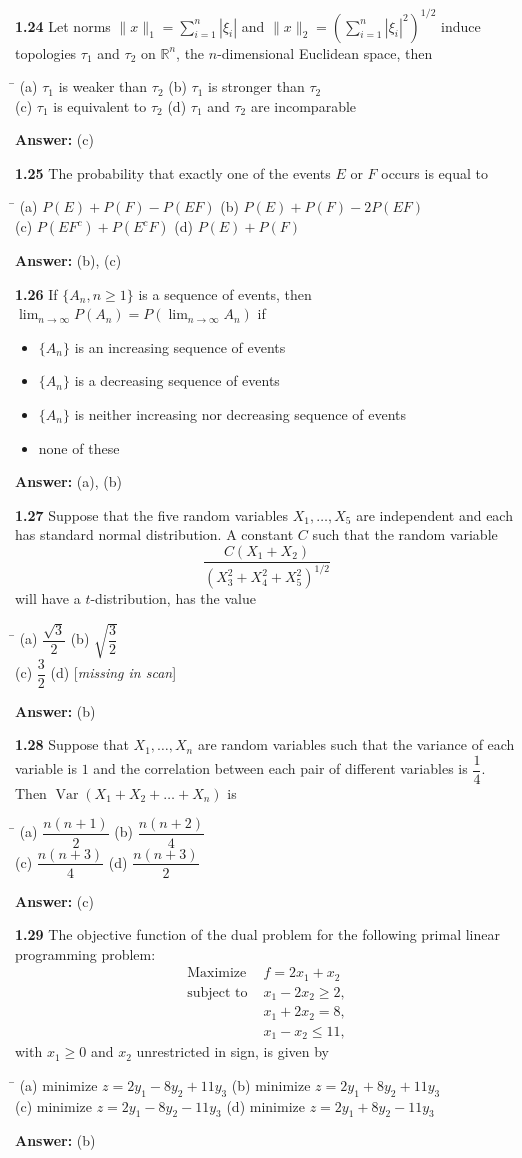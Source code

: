 \documentclass[11pt,a4paper]{article}
\newcommand{\optsfour}[4]{%
  \begin{tabbing}
    \hspace{0.48\linewidth}\=\kill
    (a) #1 \> (b) #2 \\[2pt]
    (c) #3 \> (d) #4
  \end{tabbing}%
}
\newcommand{\optslist}[4]{%
  \begin{itemize}
    \setlength{\itemsep}{2pt}\setlength{\parskip}{0pt}
    \item[(a)] #1
    \item[(b)] #2
    \item[(c)] #3
    \item[(d)] #4
  \end{itemize}%
}
\newcommand{\ans}[1]{\textbf{Answer:} #1\par\medskip}
\begin{document}
\textbf{1.24} Let norms $\|x\|_1 = \sum_{i=1}^n |\xi_i|$ and $\|x\|_2 = \left(\sum_{i=1}^n |\xi_i|^2\right)^{1/2}$ induce topologies $\tau_1$ and $\tau_2$ on $\mathbb{R}^n$, the $n$-dimensional Euclidean space, then
\optsfour{$\tau_1$ is weaker than $\tau_2$}{$\tau_1$ is stronger than $\tau_2$}{$\tau_1$ is equivalent to $\tau_2$}{$\tau_1$ and $\tau_2$ are incomparable}
\ans{(c)}

\textbf{1.25} The probability that exactly one of the events $E$ or $F$ occurs is equal to
\optsfour{$P(E) + P(F) - P(EF)$}{$P(E) + P(F) - 2P(EF)$}{$P(EF^c) + P(E^c F)$}{$P(E) + P(F)$}
\ans{(b), (c)}

\textbf{1.26} If $\{A_n, n \ge 1\}$ is a sequence of events, then $\lim_{n\to\infty} P(A_n) = P\!\left(\lim_{n\to\infty} A_n\right)$ if
\optslist{$\{A_n\}$ is an increasing sequence of events}{$\{A_n\}$ is a decreasing sequence of events}{$\{A_n\}$ is neither increasing nor decreasing sequence of events}{none of these}
\ans{(a), (b)}

\textbf{1.27} Suppose that the five random variables $X_1, \dots, X_5$ are independent and each has standard normal distribution. A constant $C$ such that the random variable
\[
  \frac{C(X_1 + X_2)}{(X_3^2 + X_4^2 + X_5^2)^{1/2}}
\]
will have a $t$-distribution, has the value
\optsfour{$\dfrac{\sqrt{3}}{2}$}{$\sqrt{\dfrac{3}{2}}$}{$\dfrac{3}{2}$}{[\textit{missing in scan}]}
\ans{(b)}

\textbf{1.28} Suppose that $X_1, \dots, X_n$ are random variables such that the variance of each variable is $1$ and the correlation between each pair of different variables is $\dfrac{1}{4}$. Then $\operatorname{Var}(X_1 + X_2 + \dots + X_n)$ is
\optsfour{$\dfrac{n(n+1)}{2}$}{$\dfrac{n(n+2)}{4}$}{$\dfrac{n(n+3)}{4}$}{$\dfrac{n(n+3)}{2}$}
\ans{(c)}

\textbf{1.29} The objective function of the dual problem for the following primal linear programming problem:
\begin{align*}
  \text{Maximize } & f = 2x_1 + x_2 \\
  \text{subject to } & x_1 - 2x_2 \ge 2, \\
                     & x_1 + 2x_2 = 8, \\
                     & x_1 - x_2 \le 11,
\end{align*}
with $x_1 \ge 0$ and $x_2$ unrestricted in sign, is given by
\optsfour{minimize $z = 2y_1 - 8y_2 + 11y_3$}{minimize $z = 2y_1 + 8y_2 + 11y_3$}{minimize $z = 2y_1 - 8y_2 - 11y_3$}{minimize $z = 2y_1 + 8y_2 - 11y_3$}
\ans{(b)}
\end{document}
